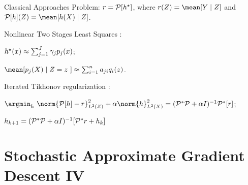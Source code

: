 \documentclass[aspectratio=169]{beamer}
\begin{document}
    \begin{frame}{Classical Approaches}
        \let\tempone\itemize
        \let\temptwo\enditemize
        \renewenvironment{itemize}{\tempone\addtolength{\itemsep}{0.7\baselineskip}}{\temptwo}
        Problem: $ r = \mathcal{P} [ h^{ \star } ] $, where $ r ( Z ) = \mean [ Y \mid Z ] $ and $ \meanop [ h ] ( Z ) = \mean [ h ( X ) \mid Z ] $.

        \begin{itemize}
            \item<2-> Nonlinear Two Stages Least Squares \cite{newey2003}:
                \begin{itemize}
                    \item $ h^{ \star } ( x ) \approx \sum_{ j=1 }^{ J } \gamma_{ j } p_{ j } ( x ) $;
                    \item $ \mean [ p_{ j } ( X ) \mid Z = z \ ] \approx \sum_{ i=1 }^{ n } a_{ ji } q_{ i } ( z ) $.
                \end{itemize}

            \item<3-> Iterated Tikhonov regularization \cite{darolles2011}:
                \begin{itemize}
                    \item $ \argmin_{ h } \ \norm{ \meanop [ h ] - r }_{ L^2 ( Z ) }^2 + \alpha \norm{ h }_{ L^2 ( X ) }^2 = ( \meanop^{ * } \meanop + \alpha I )^{ -1 } \meanop^{ * } [ r ] $;
                    \item $ h_{ k+1 } = ( \mathcal{P}^{ * } \mathcal{P} + \alpha I )^{ -1 } [ \mathcal{P}^{ * } r + h_{ k } ] $
                \end{itemize}
        \end{itemize}
    \end{frame}

    \section{Stochastic Approximate Gradient Descent IV}
\end{document}
